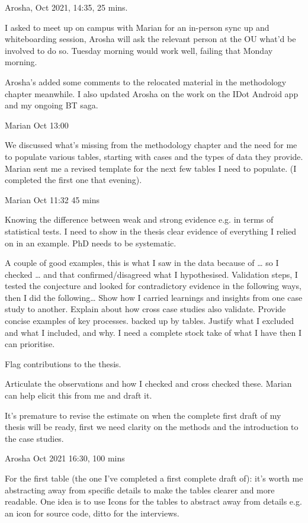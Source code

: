 \dotfill
Arosha,  Oct 2021, 14:35, 25 mins.

I asked to meet up on campus with Marian for an in-person sync up and whiteboarding session, Arosha will ask the relevant person at the OU what'd be involved to do so. Tuesday morning would work well, failing that Monday morning.

Arosha's added some comments to the relocated material in the methodology chapter meanwhile. I also updated Arosha on the work on the IDot Android app and my ongoing BT saga.

\dotfill
Marian  Oct 13:00

We discussed what's missing from the methodology chapter and the need for me to populate various tables, starting with cases and the types of data they provide. Marian sent me a revised template for the next few tables I need to populate. (I completed the first one that evening).

\dotfill
Marian  Oct 11:32 45 mins

Knowing the difference between weak and strong evidence e.g. in terms of statistical tests.
I need to show in the thesis clear evidence of everything I relied on in an example.
PhD needs to be systematic. 

A couple of good examples, this is what I saw in the data because of … so I checked … and that confirmed/disagreed what I hypothesised. 
Validation steps, I tested the conjecture and looked for contradictory evidence in the following ways, then I did the following… 
Show how I carried learnings and insights from one case study to another. Explain about how cross case studies also validate.
Provide concise examples of key processes. backed up by tables. Justify what I excluded and what I included, and why.
I need a complete stock take of what I have then I can prioritise. 

Flag contributions to the thesis.

Articulate the observations and how I checked and cross checked these.
Marian can help elicit this from me and draft it. 

It's premature to revise the estimate on when the complete first draft of my thesis will be ready, first we need clarity on the methods and the introduction to the case studies.

\dotfill
Arosha  Oct 2021 16:30, 100 mins

For the first table (the one I've completed a first complete draft of): it's worth me abstracting away from specific details to make the tables clearer and more readable. One idea is to use Icons for the tables to abstract away from details e.g. an icon for source code, ditto for the interviews.

